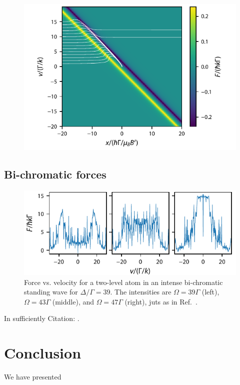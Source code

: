 \documentclass[final,5p,times,twocolumn]{elsarticle}
\begin{document}
\begin{figure}
	\center
	\includegraphics{figs/F0_to_F1_MOT_force_with_incoming_trajectories.pdf}
	\caption{\label{fig:mot_forces}}
\end{figure}


\subsection{Bi-chromatic forces}

\begin{figure}
	\center
	\includegraphics{figs/bichromatic_force}
	\caption{\label{fig:bichromatic} Force vs. velocity for a two-level atom in an intense bi-chromatic standing wave for $\Delta/\Gamma=39$.  The intensities are $\Omega =39\Gamma$ (left), $\Omega =43\Gamma$ (middle), and $\Omega =47\Gamma$ (right), juts as in Ref.~\cite{Soding1997}.}
\end{figure}

In sufficiently 
Citation: \cite{Soding1997}.

\section{Conclusion}
We have presented 
\end{document}
